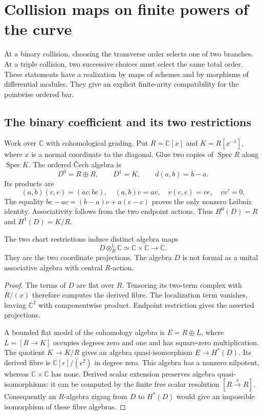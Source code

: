\chapter{Collision maps on finite powers of the curve}
\label{chap:native-ordered-collision}

At a binary collision, choosing the transverse order selects one of
two branches. At a triple collision, two successive choices must
select the same total order. These statements have a realization by
maps of schemes and by morphisms of differential modules. They give
an explicit finite-arity compatibility for the pointwise ordered bar.

\section{The binary coefficient and its two restrictions}

Work over $\mathbb C$ with cohomological grading. Put
$R=\mathbb C[x]$ and $K=R[x^{-1}]$, where $x$ is a normal coordinate
to the diagonal. Glue two copies of $\operatorname{Spec}R$ along
$\operatorname{Spec}K$. The ordered \v{C}ech algebra is
\[
 D^0=R\oplus R,\qquad D^1=K,\qquad d(a,b)=b-a.
\]
Its products are
\[
 (a,b)(c,e)=(ac,be),\quad (a,b)v=av,\quad
 v(c,e)=ve,\quad vv'=0.
\]
The equality $be-ac=(b-a)e+a(e-c)$ proves the only nonzero
Leibniz identity. Associativity follows from the two endpoint
actions. Thus $H^0(D)=R$ and $H^1(D)=K/R$.

\begin{proposition}
\label{prop:native-binary-restrictions}
The two chart restrictions induce distinct algebra maps
\[
 D\otimes_R^{\mathbb L}\mathbb C\simeq\mathbb C\times\mathbb C
 \longrightarrow\mathbb C.
\]
They are the two coordinate projections. The algebra $D$ is not
formal as a unital associative algebra with central $R$-action.
\end{proposition}
\begin{proof}
The terms of $D$ are flat over $R$. Tensoring its two-term complex
with $R/(x)$ therefore computes the derived fibre. The localization
term vanishes, leaving $\mathbb C^2$ with componentwise product.
Endpoint restriction gives the asserted projections.

A bounded flat model of the cohomology algebra is
$E=R\oplus L$, where $L=[R\to K]$ occupies degrees zero and one
and has square-zero multiplication. The quotient $K\to K/R$
gives an algebra quasi-isomorphism $E\to H^*(D)$.
Its derived fibre is $\mathbb C[\epsilon]/(\epsilon^2)$ in degree
zero. This algebra has a nonzero nilpotent, whereas
$\mathbb C\times\mathbb C$ has none. Derived scalar extension
preserves algebra quasi-isomorphisms: it can be computed by the
finite free scalar resolution $[R\xrightarrow{x}R]$.
Consequently an $R$-algebra zigzag from $D$ to $H^*(D)$ would give
an impossible isomorphism of these fibre algebras.
\end{proof}


